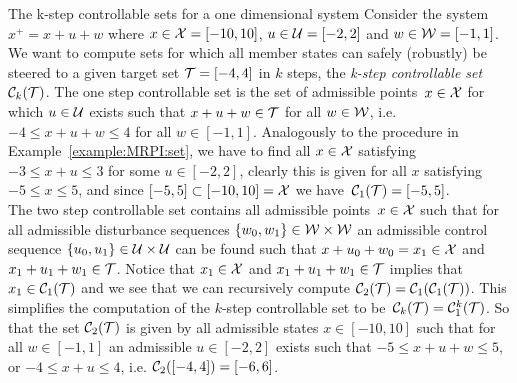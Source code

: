 \begin{example}{The k-step controllable sets for a one dimensional system}\label{example:k:step:controllable:set}
Consider the system~$x^+ = x+u+w$ where $x\in\mathcal X=[-10,10]$, $u\in\mathcal U=[-2,2]$ and $w\in\mathcal W=[-1,1]$.
%
We want to compute sets for which all member states can safely (robustly) be steered to a given target set $\mathcal T=[-4,4]$ in $k$ steps, the \emph{k-step controllable set}~$\mathcal C_k(\mathcal T)$.
%
The one step controllable set is the set of admissible points~$x\in\mathcal X$ for which $u\in\mathcal U$ exists such that $x+u+w\in\mathcal T$ for all $w\in\mathcal W$, i.e. $-4\leq x+ u+w\leq 4$ for all $w\in[-1,1]$.
%
Analogously to the procedure in Example~\ref{example:MRPI:set}, we have to find all $x\in\mathcal X$ satisfying $-3\leq x+u\leq 3$ for some $u\in[-2,2]$, clearly this is given for all $x$ satisfying $-5\leq x\leq 5$, and since $[-5,5]\subset[-10,10]=\mathcal X$ we have~$\mathcal C_1(\mathcal T)=[-5,5]$.
\\[1em]
The two step controllable set contains all admissible points~$x\in\mathcal X$ such that for all admissible disturbance sequences $\{w_0,w_1\}\in\mathcal W\times\mathcal W$ an admissible control sequence $\{u_0,u_1\}\in\mathcal U\times\mathcal U$ can be found such that $x+u_0+w_0=x_1\in\mathcal X$ and $x_1+u_1+w_1\in\mathcal T$.
%
Notice that $x_1\in\mathcal X$ and $x_1+u_1+w_1\in\mathcal T$ implies that $x_1\in\mathcal C_1(\mathcal T)$ and we see that we can recursively compute $\mathcal C_2(\mathcal T) = \mathcal C_1(\mathcal C_1(\mathcal T))$.
%
This simplifies the computation of the $k$-step controllable set to be~$\mathcal C_k(\mathcal T)=\mathcal C_1^k(\mathcal T)$.
%
So that the set $\mathcal C_2(\mathcal T)$ is given by all admissible states $x\in[-10,10]$ such that for all $w\in[-1,1]$ an admissible $u\in[-2,2]$ exists such that $-5\leq x+u+w\leq 5$, or $-4\leq x+ u\leq 4$, i.e. $\mathcal C_2([-4,4])=[-6,6]$.
\end{example}

